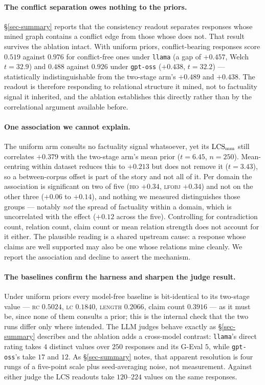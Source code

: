 \paragraph{The conflict separation owes nothing to the priors.} \S\ref{sec-summary} reports that the
consistency readout separates responses whose mined graph contains a conflict edge from those whose
does not. That result survives the ablation intact. With uniform priors, conflict-bearing responses
score $0.519$ against $0.976$ for conflict-free ones under \texttt{llama} (a gap of $+0.457$, Welch
$t = 32.9$) and $0.488$ against $0.926$ under \texttt{gpt-oss} ($+0.438$, $t = 32.2$) --- statistically
indistinguishable from the two-stage arm's $+0.489$ and $+0.438$. The readout is therefore responding
to relational structure it mined, not to factuality signal it inherited, and the ablation establishes
this directly rather than by the correlational argument available before.

\paragraph{One association we cannot explain.} The uniform arm consults no factuality signal
whatsoever, yet its $\mathrm{LCS}_{\mathrm{mm}}$ still correlates $+0.379$ with the two-stage arm's mean prior
($t = 6.45$, $n = 250$). Mean-centring within dataset reduces this to $+0.213$ but does not remove it
($t = 3.43$), so a between-corpus offset is part of the story and not all of it. Per domain the
association is significant on two of five (\textsc{bio} $+0.34$, \textsc{lfobj} $+0.34$) and not on
the other three ($+0.06$ to $+0.14$), and nothing we measured distinguishes those groups --- notably
\emph{not} the spread of factuality within a domain, which is uncorrelated with the effect
($+0.12$ across the five). Controlling for contradiction count, relation count, claim count or mean
relation strength does not account for it either. The plausible reading is a shared upstream cause: a
response whose claims are well supported may also be one whose relations mine cleanly. We report the
association and decline to assert the mechanism.

\paragraph{The baselines confirm the harness and sharpen the judge result.} Under uniform priors every
model-free baseline is bit-identical to its two-stage value --- \textsc{rc} $0.5024$, \textsc{lc}
$0.1840$, \textsc{length} $0.2066$, claim count $0.3916$ --- as it must be, since none of them consults
a prior; this is the internal check that the two runs differ only where intended. The LLM judges
behave exactly as \S\ref{sec-summary} describes and the ablation adds a cross-model contrast:
\texttt{llama}'s direct rating takes $4$ distinct values over $250$ responses and its G-Eval $5$, while
\texttt{gpt-oss}'s take $17$ and $12$. As \S\ref{sec-summary} notes, that apparent resolution is
four rungs of a five-point scale plus seed-averaging noise, not measurement. Against either judge the
LCS readouts take $120$--$224$ values on the same responses.

